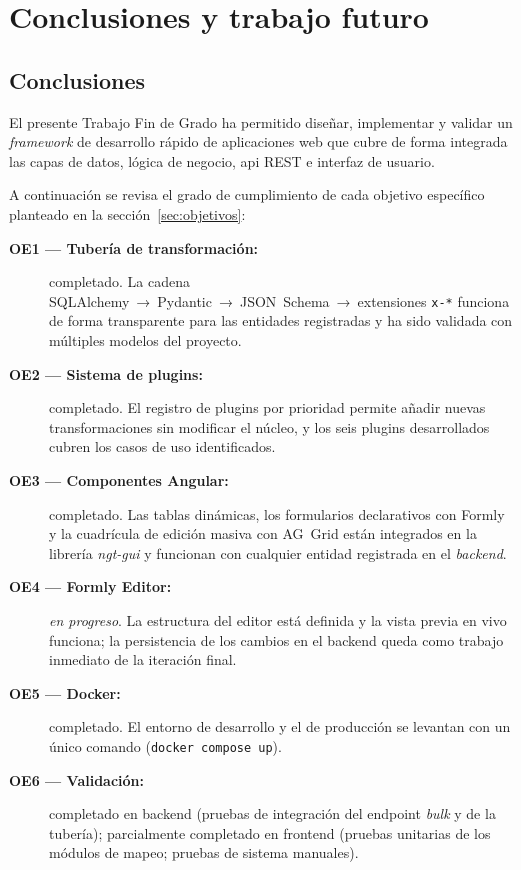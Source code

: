 \chapter{Conclusiones y trabajo futuro}
\label{ch:conclusiones}

\section{Conclusiones}
\label{sec:conclusiones}

El presente Trabajo Fin de Grado ha permitido diseñar, implementar y validar un
\textit{framework} de desarrollo rápido de aplicaciones web que cubre de forma
integrada las capas de datos, lógica de negocio, \gls{api} REST e interfaz de usuario.

A continuación se revisa el grado de cumplimiento de cada objetivo específico planteado
en la sección~\ref{sec:objetivos}:

\begin{description}
  \item[\textbf{OE1 — Tubería de transformación:}] completado. La cadena
    SQLAlchemy~→~Pydantic~→~JSON~Schema~→~extensiones \texttt{x-*} funciona de forma
    transparente para las entidades registradas y ha sido validada con múltiples modelos
    del proyecto.
  \item[\textbf{OE2 — Sistema de plugins:}] completado. El registro de plugins por
    prioridad permite añadir nuevas transformaciones sin modificar el núcleo, y los seis
    plugins desarrollados cubren los casos de uso identificados.
  \item[\textbf{OE3 — Componentes Angular:}] completado. Las tablas dinámicas, los
    formularios declarativos con Formly y la cuadrícula de edición masiva con AG~Grid
    están integrados en la librería \textit{ngt-gui} y funcionan con cualquier entidad
    registrada en el \textit{backend}.
  \item[\textbf{OE4 — Formly Editor:}] \textit{en progreso}. La estructura del editor
    está definida y la vista previa en vivo funciona; la persistencia de los cambios en
    el backend queda como trabajo inmediato de la iteración final.
  \item[\textbf{OE5 — Docker:}] completado. El entorno de desarrollo y el de producción
    se levantan con un único comando (\texttt{docker compose up}).
  \item[\textbf{OE6 — Validación:}] completado en backend (pruebas de integración del
    endpoint \textit{bulk} y de la tubería); parcialmente completado en frontend
    (pruebas unitarias de los módulos de mapeo; pruebas de sistema manuales).
\end{description}

